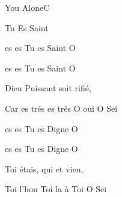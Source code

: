 \begin{song}{You Alone}{C}
\begin{xlatn}{Tu Es Saint}
    \begin{SBVerse}
       es   es  Tu es Saint O 

       es   es  Tu es Saint O 

      Dieu Puissant soit rifi\'e,

      Car  es tr\'es   es tr\'es  O oui  O Sei
    \end{SBVerse}

    \begin{SBVerse}
       es   es  Tu es Digne O 

       es   es  Tu es Digne O 

      Toi  \'etais, qui  et vien,

       Toi l'hon  Toi la  \`a Toi  O Sei
    \end{SBVerse}
  \end{xlatn}
\end{song}